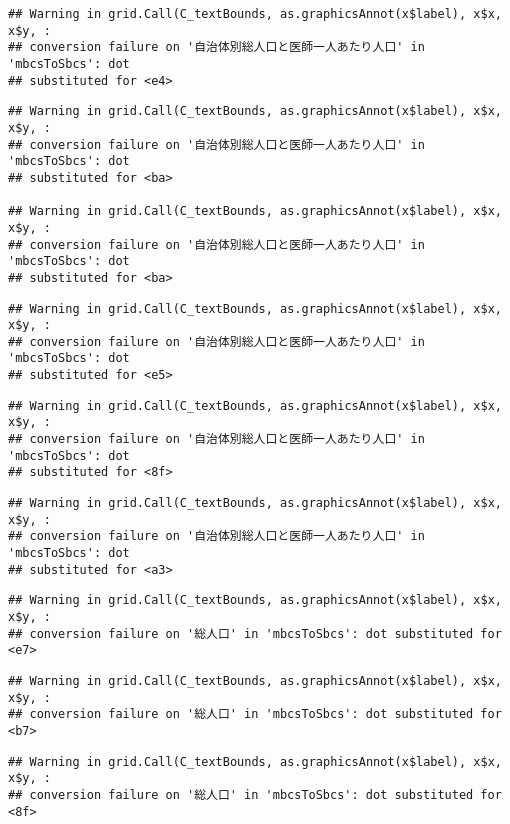 \documentclass[
]{article}
\begin{document}
\begin{verbatim}
## Warning in grid.Call(C_textBounds, as.graphicsAnnot(x$label), x$x, x$y, :
## conversion failure on '自治体別総人口と医師一人あたり人口' in 'mbcsToSbcs': dot
## substituted for <e4>
\end{verbatim}

\begin{verbatim}
## Warning in grid.Call(C_textBounds, as.graphicsAnnot(x$label), x$x, x$y, :
## conversion failure on '自治体別総人口と医師一人あたり人口' in 'mbcsToSbcs': dot
## substituted for <ba>

## Warning in grid.Call(C_textBounds, as.graphicsAnnot(x$label), x$x, x$y, :
## conversion failure on '自治体別総人口と医師一人あたり人口' in 'mbcsToSbcs': dot
## substituted for <ba>
\end{verbatim}

\begin{verbatim}
## Warning in grid.Call(C_textBounds, as.graphicsAnnot(x$label), x$x, x$y, :
## conversion failure on '自治体別総人口と医師一人あたり人口' in 'mbcsToSbcs': dot
## substituted for <e5>
\end{verbatim}

\begin{verbatim}
## Warning in grid.Call(C_textBounds, as.graphicsAnnot(x$label), x$x, x$y, :
## conversion failure on '自治体別総人口と医師一人あたり人口' in 'mbcsToSbcs': dot
## substituted for <8f>
\end{verbatim}

\begin{verbatim}
## Warning in grid.Call(C_textBounds, as.graphicsAnnot(x$label), x$x, x$y, :
## conversion failure on '自治体別総人口と医師一人あたり人口' in 'mbcsToSbcs': dot
## substituted for <a3>
\end{verbatim}

\begin{verbatim}
## Warning in grid.Call(C_textBounds, as.graphicsAnnot(x$label), x$x, x$y, :
## conversion failure on '総人口' in 'mbcsToSbcs': dot substituted for <e7>
\end{verbatim}

\begin{verbatim}
## Warning in grid.Call(C_textBounds, as.graphicsAnnot(x$label), x$x, x$y, :
## conversion failure on '総人口' in 'mbcsToSbcs': dot substituted for <b7>
\end{verbatim}

\begin{verbatim}
## Warning in grid.Call(C_textBounds, as.graphicsAnnot(x$label), x$x, x$y, :
## conversion failure on '総人口' in 'mbcsToSbcs': dot substituted for <8f>
\end{verbatim}
\end{document}

